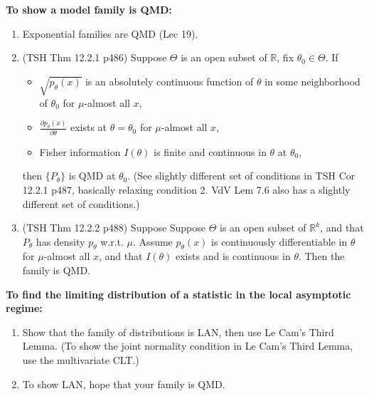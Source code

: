 \documentclass[twoside]{article}
\newcommand{\dis}{\displaystyle}
\newcommand\bbR{\mathbb{R}}
\def\t{\theta}
\newcommand\T{\Theta}
\begin{document}
\textbf{To show a model family is QMD:}
\begin{enumerate}
\item Exponential families are QMD (Lec 19).

\item (TSH Thm 12.2.1 p486) Suppose $\T$ is an open subset of $\bbR$, fix $\t_0 \in \T$. If
\begin{itemize}
\item $\sqrt{p_\t(x)}$ is an absolutely continuous function of $\t$ in some neighborhood of $\t_0$ for $\mu$-almost all $x$, 
\item $\dis\frac{\partial p_\t(x)}{\partial \t}$ exists at $\t = \t_0$ for $\mu$-almost all $x$,
\item Fisher information $I(\t)$ is finite and continuous in $\t$ at $\t_0$,
\end{itemize}
then $\{ P_\t \}$ is QMD at $\t_0$. (See slightly different set of conditions in TSH Cor 12.2.1 p487, basically relaxing condition 2. VdV Lem 7.6 also has a slightly different set of conditions.)

\item (TSH Thm 12.2.2 p488) Suppose Suppose $\T$ is an open subset of $\bbR^k$, and that $P_\t$ has density $p_\t$ w.r.t. $\mu$. Assume $p_\t(x)$ is continuously differentiable in $\t$ for $\mu$-almost all $x$, and that $I(\t)$ exists and is continuous in $\t$. Then the family is QMD.
\end{enumerate}


\textbf{To find the limiting distribution of a statistic in the local asymptotic regime:}
\begin{enumerate}
\item Show that the family of distributions is LAN, then use Le Cam's Third Lemma. (To show the joint normality condition in Le Cam's Third Lemma, use the multivariate CLT.)

\item To show LAN, hope that your family is QMD.

\end{enumerate}
\end{document}
